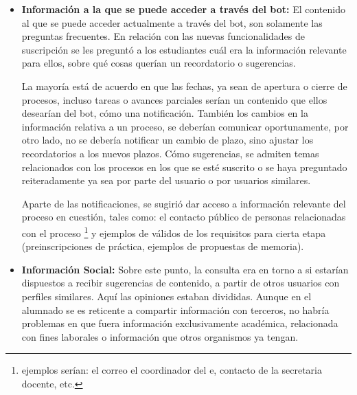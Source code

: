     \begin{itemize}
        \item \textbf{Información a la que se puede acceder a través del bot:} El contenido al que se puede acceder actualmente a través del bot, son solamente las preguntas frecuentes. En relación con las nuevas funcionalidades de suscripción se les preguntó a los estudiantes cuál era la información relevante para ellos, sobre qué cosas querían un recordatorio o sugerencias.
        \par La mayoría está de acuerdo en que las fechas, ya sean de apertura o cierre de procesos, incluso tareas o avances parciales serían un contenido que ellos desearían del bot, cómo una notificación. También los cambios en la información relativa a un proceso, se deberían comunicar oportunamente, por otro lado, no se debería notificar un cambio de plazo, sino ajustar los recordatorios a los nuevos plazos. Cómo sugerencias, se admiten temas relacionados con los procesos en los que se esté suscrito o se haya preguntado reiteradamente ya sea por parte del usuario o por usuarios \guillemotleft similares\guillemotright.
        \par Aparte de las notificaciones, se sugirió dar acceso a información relevante del proceso en cuestión, tales como: el contacto público de personas relacionadas con el proceso \footnote{ejemplos serían: el correo el coordinador del \acrshort{e}, contacto de la secretaria docente, etc.} y ejemplos de válidos de los requisitos para cierta etapa (preinscripciones de práctica, ejemplos de propuestas de memoria).

        \item \textbf{Información Social:} Sobre este punto, la consulta era en torno a si estarían dispuestos a recibir sugerencias de contenido, a partir de otros usuarios con perfiles similares.
        Aquí las opiniones estaban divididas. Aunque en el alumnado se es reticente a compartir información con terceros, no habría problemas en que fuera información exclusivamente académica, relacionada con fines laborales o información que otros organismos ya tengan.


\end{itemize}
